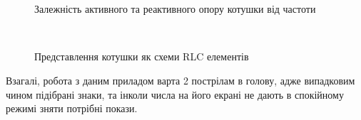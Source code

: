 \begin{figure}[h]
    \begin{minipage}[h]{0.47\linewidth}
         \\
    \end{minipage}
    \hfill
    \begin{minipage}[h]{0.47\linewidth}
        \\
    \end{minipage}    
    \caption{Залежність активного та реактивного опору котушки від частоти}
    \label{fig:part23}
\end{figure}
\begin{figure}[h]    
         \\
    \caption{Представлення котушки як схеми RLC елементів}
    \label{fig:ssanahuina}
\end{figure}

Взагалі, робота з даним приладом варта 2 пострілам в голову, адже випадковим чином підібрані знаки, та інколи числа на його екрані не дають в спокійному режимі зняти потрібні покази.